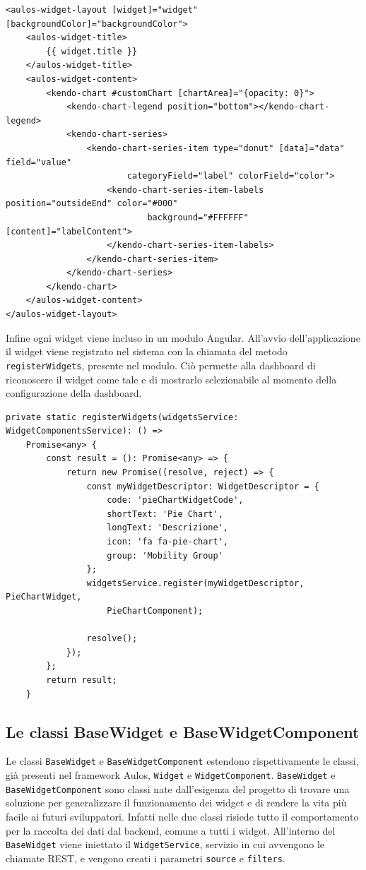 \begin{lstlisting}[caption={File pie-chart.component.html}, style=javaScriptCode]
<aulos-widget-layout [widget]="widget" [backgroundColor]="backgroundColor">
    <aulos-widget-title>
        {{ widget.title }}
    </aulos-widget-title>
    <aulos-widget-content>
        <kendo-chart #customChart [chartArea]="{opacity: 0}">
            <kendo-chart-legend position="bottom"></kendo-chart-legend>
            <kendo-chart-series>
                <kendo-chart-series-item type="donut" [data]="data" field="value" 
                        categoryField="label" colorField="color">
                    <kendo-chart-series-item-labels position="outsideEnd" color="#000" 
                            background="#FFFFFF" [content]="labelContent">
                    </kendo-chart-series-item-labels>
                </kendo-chart-series-item>
            </kendo-chart-series>
        </kendo-chart>
    </aulos-widget-content>
</aulos-widget-layout>
\end{lstlisting}
Infine ogni widget viene incluso in un modulo Angular. All'avvio dell'applicazione il widget viene registrato nel sistema con la chiamata del metodo \verb|registerWidgets|, presente nel modulo. Ciò permette alla dashboard di riconoscere il widget come tale e di mostrarlo selezionabile al momento della configurazione della dashboard.

\begin{lstlisting}[caption={Metodo all'interno del modulo che registra il widget nel sistema}, style=javaScriptCode]
private static registerWidgets(widgetsService: WidgetComponentsService): () => 
    Promise<any> {
        const result = (): Promise<any> => {
            return new Promise((resolve, reject) => {
                const myWidgetDescriptor: WidgetDescriptor = {
                    code: 'pieChartWidgetCode',
                    shortText: 'Pie Chart',
                    longText: 'Descrizione',
                    icon: 'fa fa-pie-chart',
                    group: 'Mobility Group'
                };
                widgetsService.register(myWidgetDescriptor, PieChartWidget, 
                    PieChartComponent);

                resolve();
            });
        };
        return result;
    }
\end{lstlisting}

\subsection{Le classi BaseWidget e BaseWidgetComponent}
\label{subsec:base}
Le classi \verb|BaseWidget| e \verb|BaseWidgetComponent| estendono rispettivamente le classi, già presenti nel framework Aulos, \verb|Widget| e \verb|WidgetComponent|. \verb|BaseWidget| e \verb|BaseWidgetComponent| sono classi nate dall'esigenza del progetto di trovare una soluzione per generalizzare il funzionamento dei widget e di rendere la vita più facile ai futuri sviluppatori.
Infatti nelle due classi risiede tutto il comportamento per la raccolta dei dati dal backend, comune a tutti i widget.
All'interno del \verb|BaseWidget| viene iniettato il \verb|WidgetService|, servizio in cui avvengono le chiamate REST, e vengono creati i parametri \verb|source| e \verb|filters|.

